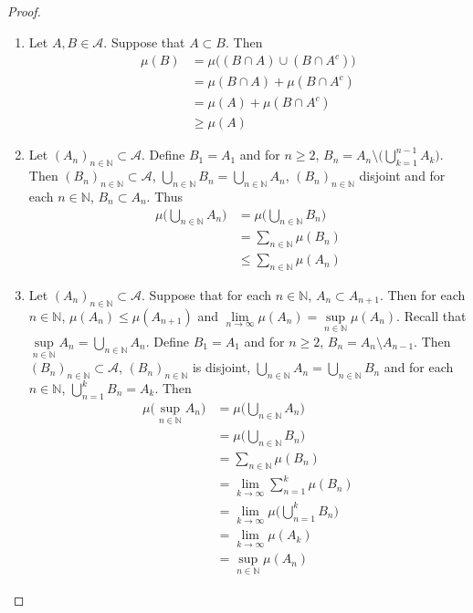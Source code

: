 \documentclass[12pt]{amsart}
\newcommand{\N}{\mathbb{N}}
\newcommand{\MA}{\mathcal{A}}
\begin{document}
\begin{proof}\
	\begin{enumerate}
		\item Let $A, B \in \MA$. Suppose that $A \subset B$. Then 
		\begin{align*}
			\mu(B) 
			&= \mu\bigg((B \cap A) \cup (B \cap A^c)\bigg)\\
			&= \mu(B \cap A) + \mu(B \cap A^c)\\
			&= \mu(A) + \mu(B \cap A^c)\\
			&\geq \mu(A)
		\end{align*}
		\item Let $(A_n)_{n \in \N} \subset \MA$. Define $B_1 = A_1$ and for $n \geq 2$, $B_n = A_n \setminus \bigg( \bigcup\limits_{k=1}^{n-1}A_k \bigg)$. Then $(B_n)_{n \in \N} \subset \MA$, $\bigcup\limits_{n \in \N}B_n = \bigcup\limits_{n \in \N}A_n $, $(B_n)_{n \in \N}$ disjoint and for each $n \in \N$, $B_n \subset A_n$. Thus 
		\begin{align*}
			\mu\bigg(\bigcup_{n \in \N}A_n \bigg)
			&= \mu\bigg(\bigcup_{n \in \N}B_n \bigg)\\
			&= \sum_{n \in \N}\mu(B_n) \\
			&\leq \sum_{n \in \N}\mu(A_n)
		\end{align*} 
		\item Let $(A_n)_{n \in \N} \subset \MA$. Suppose that for each $n \in \N$, $A_n \subset A_{n+1}$. Then for each $n \in \N$, $\mu(A_n) \leq \mu(A_{n+1})$ and $\lim\limits_{n \rightarrow \infty}\mu(A_n) = \sup\limits_{n \in \N} \mu(A_n)$. Recall that $\sup\limits_{n \in \N}A_n = \bigcup\limits_{n \in \N}A_n$. 
		Define $B_1 = A_1$ and for $n \geq 2$, $B_n = A_n \setminus A_{n-1}$. Then $(B_n)_{n \in \N} \subset \MA$, $(B_n)_{n \in \N}$ is disjoint, $\bigcup\limits_{n \in \N}A_n = \bigcup\limits_{n \in \N}B_n$ and for each $n \in \N$, $\bigcup\limits_{n=1}^{k}B_n = A_k$. Then 
		\begin{align*}
			\mu\bigg(\sup_{n \in \N}A_n \bigg)
			&= \mu\bigg(\bigcup_{n \in \N}A_n \bigg) \\
			&= \mu\bigg(\bigcup\limits_{n \in \N}B_n \bigg)\\
			&= \sum_{n \in \N} \mu(B_n) \\
			&= \lim_{k \rightarrow \infty} \sum_{n=1}^k \mu(B_n) \\
			&= \lim_{k \rightarrow \infty} \mu \bigg(\bigcup_{n=1}^k B_n \bigg) \\
			&= \lim_{k \rightarrow \infty} \mu(A_k) \\
			&= \sup_{n \in \N} \mu(A_n)

\end{align*}
\end{enumerate}
\end{proof}
\end{document}
